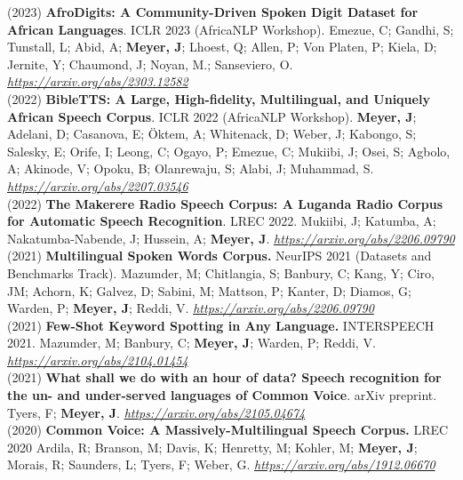 \documentclass{resume} %
\begin{document}
\vspace{.25cm}

{(2023)}
{\bf AfroDigits: A Community-Driven Spoken Digit Dataset for African Languages}.
       {ICLR 2023 (AfricaNLP Workshop)}.
       {Emezue, C; Gandhi, S; Tunstall, L; Abid, A; \textbf{Meyer, J}; Lhoest, Q; Allen, P; Von Platen, P; Kiela, D; Jernite, Y; Chaumond, J; Noyan, M.; Sanseviero, O}.
       \emph{\url{https://arxiv.org/abs/2303.12582}}
       \\

{(2022)}
{\bf BibleTTS: A Large, High-fidelity, Multilingual, and Uniquely African Speech Corpus}.
       {ICLR 2022 (AfricaNLP Workshop)}.
       {\textbf{Meyer, J}; Adelani, D; Casanova, E; Öktem, A; Whitenack, D; Weber, J; Kabongo, S; Salesky, E; Orife, I; Leong, C; Ogayo, P; Emezue, C; Mukiibi, J; Osei, S; Agbolo, A; Akinode, V; Opoku, B; Olanrewaju, S; Alabi, J; Muhammad, S}.
       \emph{\url{https://arxiv.org/abs/2207.03546}}
       \\

{(2022)}
{\bf The Makerere Radio Speech Corpus: A Luganda Radio Corpus for Automatic Speech Recognition}.
       {LREC 2022}.
       {Mukiibi, J; Katumba, A; Nakatumba-Nabende, J; Hussein, A; \textbf{Meyer, J}}.
       \emph{\url{https://arxiv.org/abs/2206.09790}}\\
      
{(2021)}
{\bf Multilingual Spoken Words Corpus.}
       {NeurIPS 2021 (Datasets and Benchmarks Track)}.
       {Mazumder, M; Chitlangia, S; Banbury, C; Kang, Y; Ciro, JM; Achorn, K; Galvez, D; Sabini, M; Mattson, P; Kanter, D; Diamos, G; Warden, P; \textbf{Meyer, J}; Reddi, V.}
       \emph{\url{https://arxiv.org/abs/2206.09790}}
       \\

{(2021)}
{\bf Few-Shot Keyword Spotting in Any Language.}
       {INTERSPEECH 2021}.
       {Mazumder, M; Banbury, C; \textbf{Meyer, J}; Warden, P; Reddi, V.}
       \emph{\url{https://arxiv.org/abs/2104.01454}}
       \\


{(2021)}
{\bf What shall we do with an hour of data? Speech recognition for the un- and under-served languages of Common Voice}.
       {arXiv preprint}.
       {Tyers, F; \textbf{Meyer, J}}.
       \emph{\url{https://arxiv.org/abs/2105.04674}}
       \\

{(2020)}
{\bf Common Voice: A Massively-Multilingual Speech Corpus.}
       {LREC 2020}
       {Ardila, R; Branson, M; Davis, K; Henretty, M; Kohler, M; \textbf{Meyer, J}; Morais, R; Saunders, L; Tyers, F; Weber, G}.
       \emph{\url{https://arxiv.org/abs/1912.06670}}
       \\
\end{document}
